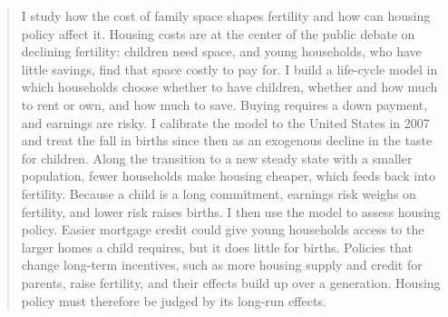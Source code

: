 \begin{abstract}
\noindent
I study how the cost of family space shapes fertility and how can housing
policy affect it. Housing costs are at the center of the public debate
on declining fertility: children need space, and young households, who have
little savings, find that space costly to pay for. I build a life-cycle model
in which households choose whether to have children, whether and how much to
rent or own, and how much to save. Buying requires a down payment, and
earnings are risky. I calibrate the model to the United States in 2007 and
treat the fall in births since then as an exogenous decline in the taste for
children. Along the transition to a new steady state with a smaller
population, fewer households make housing cheaper, which feeds back into
fertility. Because a child is a long commitment, earnings risk weighs on
fertility, and lower risk raises births. I then use the model to assess
housing policy. Easier mortgage credit could give young households access to
the larger homes a child requires, but it does little for births. Policies
that change long-term incentives, such as more housing supply and credit for
parents, raise fertility, and their effects build up over a generation.
Housing policy must therefore be judged by its long-run effects.

\end{abstract}
